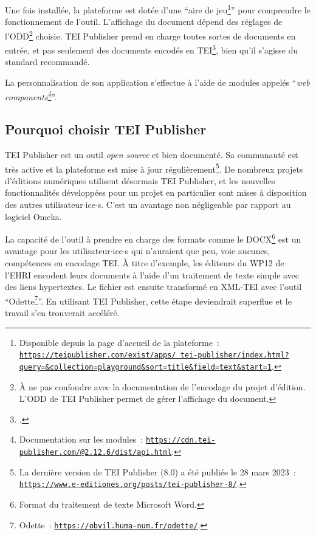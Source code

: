 Une fois installée, la plateforme est dotée d'une \enquote{aire de jeu\footnote{Disponible depuis la page d'accueil de la plateforme~: \texttt{\href{https://teipublisher.com/exist/apps/tei-publisher/index.html?query=&collection=playground&sort=title&field=text&start=1}{https://teipublisher.com/exist/apps/ tei-publisher/index.html?query=\&collection=playground\&sort=title\&field=text\&start=1}}.}} pour comprendre le fonctionnement de l'outil. L'affichage du document dépend des réglages de l'ODD\footnote{À ne pas confondre avec la documentation de l'encodage du projet d'édition. L'ODD de TEI Publisher permet de gérer l'affichage du document.} choisie. TEI Publisher prend en charge toutes sortes de documents en entrée, et pas seulement des documents encodés en TEI\footcite{Chiffoleau2020}{}, bien qu'il s'agisse du standard recommandé.  

\bigskip
La personnalisation de son application s'effectue à l'aide de modules appelés \enquote{\textit{web components\footnote{Documentation sur les modules~: \texttt{\href{https://cdn.tei-publisher.com/@2.12.6/dist/api.html}{https://cdn.tei-publisher.com/@2.12.6/dist/api.html}}.}}}.


\subsection{Pourquoi choisir TEI Publisher}
TEI Publisher est un outil \textit{open source} et bien documenté. Sa communauté est très active et la plateforme est mise à jour régulièrement\footnote{La dernière version de TEI Publisher (8.0) a été publiée le 28 mars 2023~: \texttt{\href{https://www.e-editiones.org/posts/tei-publisher-8/}{https://www.e-editiones.org/posts/tei-publisher-8/}}.}. De nombreux projets d'éditions numériques utilisent désormais TEI Publisher, et les nouvelles fonctionnalités développées pour un projet en particulier sont mises à disposition des autres utilisateur$\cdot$ice$\cdot$s. C'est un avantage non négligeable par rapport au logiciel Omeka.  

La capacité de l'outil à prendre en charge des formats comme le DOCX\footnote{Format du traitement de texte Microsoft Word.} est un avantage pour les utilisateur$\cdot$ice$\cdot$s qui n'auraient que peu, voie aucunes, compétences en encodage TEI. À titre d'exemple, les éditeurs du WP12 de l'EHRI encodent leurs documents à l'aide d'un traitement de texte simple avec des liens hypertextes. Le fichier est ensuite transformé en XML-TEI avec l'outil \enquote{Odette\footnote{Odette~: \texttt{\href{https://obvil.huma-num.fr/odette/}{https://obvil.huma-num.fr/odette/}}.}}. En utilisant TEI Publisher, cette étape deviendrait superflue et le travail s'en trouverait accéléré.  

